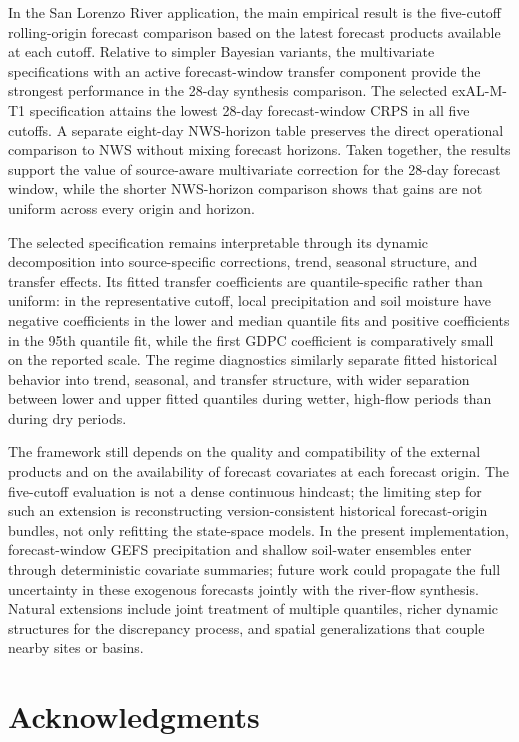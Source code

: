 \documentclass[APA,STIX1COL]{WileyNJD-v2}
\begin{document}
In the San Lorenzo River application, the main empirical result is the five-cutoff rolling-origin forecast comparison based on the latest forecast products available at each cutoff. Relative to simpler Bayesian variants, the multivariate specifications with an active forecast-window transfer component provide the strongest performance in the 28-day synthesis comparison. The selected exAL-M-T1 specification attains the lowest 28-day forecast-window CRPS in all five cutoffs. A separate eight-day NWS-horizon table preserves the direct operational comparison to NWS without mixing forecast horizons. Taken together, the results support the value of source-aware multivariate correction for the 28-day forecast window, while the shorter NWS-horizon comparison shows that gains are not uniform across every origin and horizon.

The selected specification remains interpretable through its dynamic decomposition into source-specific corrections, trend, seasonal structure, and transfer effects. Its fitted transfer coefficients are quantile-specific rather than uniform: in the representative cutoff, local precipitation and soil moisture have negative coefficients in the lower and median quantile fits and positive coefficients in the 95th quantile fit, while the first GDPC coefficient is comparatively small on the reported scale. The regime diagnostics similarly separate fitted historical behavior into trend, seasonal, and transfer structure, with wider separation between lower and upper fitted quantiles during wetter, high-flow periods than during dry periods.

The framework still depends on the quality and compatibility of the external products and on the availability of forecast covariates at each forecast origin. The five-cutoff evaluation is not a dense continuous hindcast; the limiting step for such an extension is reconstructing version-consistent historical forecast-origin bundles, not only refitting the state-space models. In the present implementation, forecast-window GEFS precipitation and shallow soil-water ensembles enter through deterministic covariate summaries; future work could propagate the full uncertainty in these exogenous forecasts jointly with the river-flow synthesis. Natural extensions include joint treatment of multiple quantiles, richer dynamic structures for the discrepancy process, and spatial generalizations that couple nearby sites or basins.




\section*{Acknowledgments}
\end{document}
